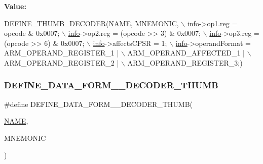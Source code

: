 {\bfseries Value\+:}
\begin{DoxyCode}
\mbox{\hyperlink{decoder-thumb_8c_a44d34ec3fd7c2c2ee51ff5966678c86e}{DEFINE\_THUMB\_DECODER}}(\mbox{\hyperlink{inflate_8h_a164ea0159d5f0b5f12a646f25f99eceaa67bc2ced260a8e43805d2480a785d312}{NAME}}, MNEMONIC, \(\backslash\)
        \mbox{\hyperlink{libretro_8h_structretro__game__info}{info}}->op1.reg = opcode & 0x0007; \(\backslash\)
        \mbox{\hyperlink{libretro_8h_structretro__game__info}{info}}->op2.reg = (opcode >> 3) & 0x0007; \(\backslash\)
        \mbox{\hyperlink{libretro_8h_structretro__game__info}{info}}->op3.reg = (opcode >> 6) & 0x0007; \(\backslash\)
        \mbox{\hyperlink{libretro_8h_structretro__game__info}{info}}->affectsCPSR = 1; \(\backslash\)
        \mbox{\hyperlink{libretro_8h_structretro__game__info}{info}}->operandFormat = ARM\_OPERAND\_REGISTER\_1 | \(\backslash\)
            ARM\_OPERAND\_AFFECTED\_1 | \(\backslash\)
            ARM\_OPERAND\_REGISTER\_2 | \(\backslash\)
            ARM\_OPERAND\_REGISTER\_3;)
\end{DoxyCode}
\mbox{\label{decoder-thumb_8c_a69fb22d6b74f08be3a1b681faf150d43}} 
\subsubsection{\texorpdfstring{D\+E\+F\+I\+N\+E\+\_\+\+D\+A\+T\+A\+\_\+\+F\+O\+R\+M\+\_\+\_\+\+D\+E\+C\+O\+D\+E\+R\+\_\+\+T\+H\+U\+MB}{DEFINE\_DATA\_FORM\_2\_DECODER\_THUMB}}
{\footnotesize\ttfamily \#define D\+E\+F\+I\+N\+E\+\_\+\+D\+A\+T\+A\+\_\+\+F\+O\+R\+M\+\_\+\_\+\+D\+E\+C\+O\+D\+E\+R\+\_\+\+T\+H\+U\+MB(\begin{DoxyParamCaption}\item[{}]{\mbox{\hyperlink{inflate_8h_a164ea0159d5f0b5f12a646f25f99eceaa67bc2ced260a8e43805d2480a785d312}{N\+A\+ME}},  }\item[{}]{M\+N\+E\+M\+O\+N\+IC }\end{DoxyParamCaption})}

